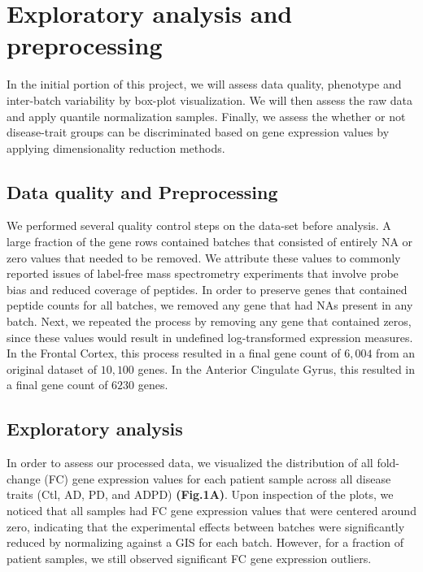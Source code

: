 \section{Exploratory analysis and preprocessing}
\label{sec:expl-analys-prepr}

 In the initial portion of this project, we will assess data quality, phenotype and  inter-batch variability by box-plot visualization. We will then assess the raw data and apply quantile normalization samples. Finally, we assess the whether or not disease-trait groups can be discriminated based on gene expression values by applying dimensionality reduction methods. 


\subsection{Data quality and Preprocessing}
\label{subsec:data-qual-vari}

We performed several quality control steps on the data-set before analysis. A large fraction of the gene rows contained batches that consisted of entirely NA or zero values that needed to be removed. We attribute these values to commonly reported issues of label-free mass spectrometry experiments that involve probe bias and reduced coverage of peptides. In order to preserve genes that contained peptide counts for all batches, we removed any gene that had NAs present in any batch. Next, we repeated the process by removing any gene that contained zeros, since these values would result in undefined log-transformed expression measures. In the Frontal Cortex, this process resulted in a final gene count of $6,004$ from an original dataset of $10,100$ genes. In the Anterior Cingulate Gyrus, this resulted in a final gene count of $6230$ genes. 

\subsection{Exploratory analysis}
\label{subsec:exploratory-analysis}

In order to assess our processed data, we visualized the distribution of all fold-change (FC) gene expression values for each patient sample across all disease traits (Ctl, AD, PD, and ADPD) \textbf{ (Fig.1A)}. Upon inspection of the plots, we noticed that all samples had FC gene expression values that were centered around zero, indicating that the experimental effects between batches were significantly reduced by normalizing against a GIS for each batch. However, for a fraction of patient samples, we still observed significant FC gene expression outliers. 

